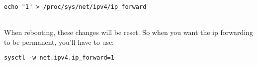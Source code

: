 \begin{verbatim}echo "1" > /proc/sys/net/ipv4/ip_forward \end{verbatim} \\
When rebooting, these changes will be reset. So when you want the ip forwarding to be permanent, you'll have to use: \\
\begin{verbatim}sysctl -w net.ipv4.ip_forward=1\end{verbatim}